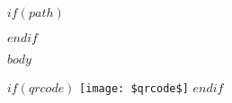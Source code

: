 \documentclass[a4paper,11pt]{article}
\begin{document}
$if(path)$

$endif$

\setcounter{secnumdepth}{3}
\setcounter{tocdepth}{1}
\tableofcontents
\newpage
$body$
\vspace{10mm}

$if(qrcode)$
  \texttt{[image: \$qrcode\$]}
$endif$
\end{document}
